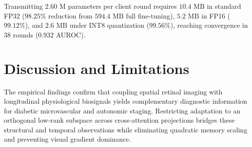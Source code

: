 \documentclass[a4paper,fleqn]{cas-dc}
\begin{document}
\begin{table}[t]
\centering
\caption{Experiment 10: Federated Distributed Client Scaling ($50$ Nodes).}
\label{tab:exp11_federated}
\end{table}

Transmitting $2.60\text{ M}$ parameters per client round requires $10.4\text{ MB}$ in standard FP32 ($98.25\%$ reduction from $594.4\text{ MB}$ full fine-tuning), $5.2\text{ MB}$ in FP16 ($99.12\%$), and $2.6\text{ MB}$ under INT8 quantization ($99.56\%$), reaching convergence in 38 rounds ($0.932$ AUROC).

\section{Discussion and Limitations}
\label{sec:discussion}
The empirical findings confirm that coupling spatial retinal imaging with longitudinal physiological biosignals yields complementary diagnostic information for diabetic microvascular and autonomic staging. Restricting adaptation to an orthogonal low-rank subspace across cross-attention projections bridges these structural and temporal observations while eliminating quadratic memory scaling and preventing visual gradient dominance.
\end{document}
